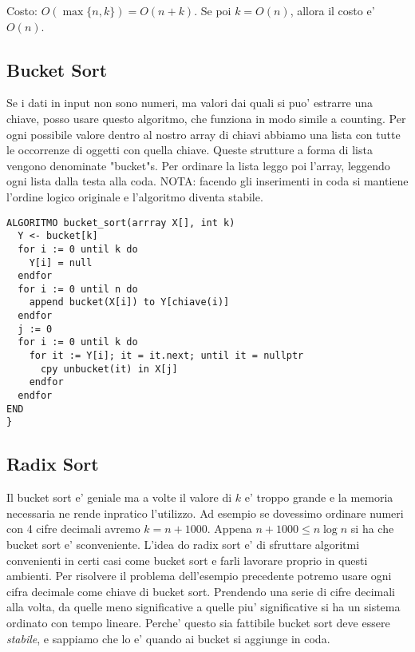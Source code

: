 \documentclass{article}
\begin{document}
Costo: $O(\max \{n, k\}) = O(n + k)$. Se poi $k = O(n)$, allora il costo e' $O(n)$.

\subsection{Bucket Sort}

Se i dati in input non sono numeri, ma valori dai quali si puo' estrarre una chiave,
posso usare questo algoritmo, che funziona in modo simile a counting. Per ogni
possibile valore dentro al nostro array di chiavi abbiamo una lista con tutte
le occorrenze di oggetti con quella chiave. Queste strutture a forma di lista
vengono denominate "bucket"s. Per ordinare la lista leggo poi l'array, leggendo
ogni lista dalla testa alla coda.
NOTA: facendo gli inserimenti in coda si mantiene l'ordine logico originale e
l'algoritmo diventa stabile.

\begin{lstlisting}
ALGORITMO bucket_sort(arrray X[], int k)
  Y <- bucket[k]
  for i := 0 until k do
    Y[i] = null
  endfor
  for i := 0 until n do
    append bucket(X[i]) to Y[chiave(i)] 
  endfor
  j := 0
  for i := 0 until k do
    for it := Y[i]; it = it.next; until it = nullptr
      cpy unbucket(it) in X[j]
    endfor
  endfor
END
}
\end{lstlisting}

\subsection{Radix Sort}

Il bucket sort e' geniale ma a volte il valore di $k$ e' troppo grande e la memoria
necessaria ne rende inpratico l'utilizzo. Ad esempio se dovessimo ordinare numeri
con 4 cifre decimali avremo $k = n + 1000$. Appena $n + 1000 \leq n \log n$ si ha
che bucket sort e' sconveniente. L'idea do radix sort e' di sfruttare algoritmi
convenienti in certi casi come bucket sort e farli lavorare proprio in questi ambienti.
Per risolvere il problema dell'esempio precedente potremo usare ogni cifra decimale
come chiave di bucket sort. Prendendo una serie di cifre decimali alla volta, da
quelle meno significative a quelle piu' significative si ha un sistema ordinato con
tempo lineare. Perche' questo sia fattibile bucket sort deve essere \emph{stabile},
e sappiamo che lo e' quando ai bucket si aggiunge in coda.
\end{document}
